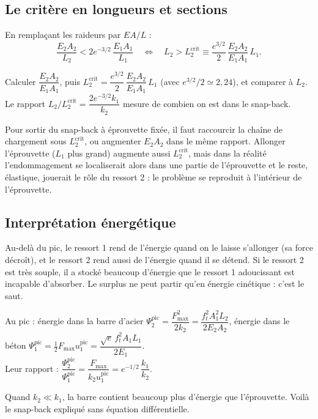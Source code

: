 \documentclass[11pt,a4paper]{article}
\begin{document}
\subsection{Le critère en longueurs et sections}
En remplaçant les raideurs par $EA/L$ :
\begin{equation}
  \frac{E_2A_2}{L_2} < 2e^{-3/2}\,\frac{E_1A_1}{L_1}
  \quad\Longleftrightarrow\quad
  L_2 > L_2^{\text{crit}} \equiv \frac{e^{3/2}}{2}\,\frac{E_2A_2}{E_1A_1}\,L_1 .
\end{equation}
\begin{alamain}
Calculer $\dfrac{E_2A_2}{E_1A_1}$, puis $L_2^{\text{crit}} = \dfrac{e^{3/2}}{2}\,\dfrac{E_2A_2}{E_1A_1}\,L_1$
(avec $e^{3/2}/2 \simeq 2{,}24$), et comparer à $L_2$. Le rapport
$L_2/L_2^{\text{crit}} = \dfrac{2e^{-3/2}k_1}{k_2}$ mesure de combien on est dans le snap-back.
\end{alamain}
Pour sortir du snap-back à éprouvette fixée, il faut raccourcir la chaîne de chargement sous
$L_2^{\text{crit}}$, ou augmenter $E_2A_2$ dans le même rapport. Allonger l'éprouvette ($L_1$ plus
grand) augmente aussi $L_2^{\text{crit}}$, mais dans la réalité l'endommagement se localiserait
alors dans une partie de l'éprouvette et le reste, élastique, jouerait le rôle du ressort 2 :
le problème se reproduit à l'intérieur de l'éprouvette.

\subsection{Interprétation énergétique}
Au-delà du pic, le ressort 1 rend de l'énergie quand on le laisse s'allonger (sa force décroît),
et le ressort 2 rend aussi de l'énergie quand il se détend. Si le ressort 2 est très souple, il a
stocké beaucoup d'énergie que le ressort 1 adoucissant est incapable d'absorber. Le surplus ne
peut partir qu'en énergie cinétique : c'est le saut.
\begin{alamain}
Au pic : énergie dans la barre d'acier $\Psi_2^{\text{pic}} = \dfrac{F_{\max}^2}{2k_2} = \dfrac{f_t^2A_1^2L_2}{2E_2A_2}$,
énergie dans le béton $\Psi_1^{\text{pic}} = \tfrac12F_{\max}u_1^{\text{pic}} = \dfrac{\sqrt e\,f_t^2A_1L_1}{2E_1}$.\\
Leur rapport : $\dfrac{\Psi_2^{\text{pic}}}{\Psi_1^{\text{pic}}} = \dfrac{F_{\max}}{k_2u_1^{\text{pic}}} = e^{-1/2}\,\dfrac{k_1}{k_2}$.
\end{alamain}
Quand $k_2 \ll k_1$, la barre contient beaucoup plus d'énergie que l'éprouvette. Voilà le
snap-back expliqué sans équation différentielle.
\end{document}
